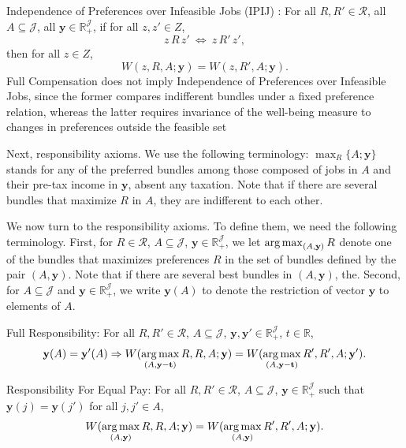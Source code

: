 Independence of Preferences over Infeasible Jobs (IPIJ) : 
For all $R,R'\in\mathcal R$, all $A\subseteq \mathcal J$, all $\mathbf y\in\mathbb R_+^{\mathcal J}$, if for all $z,z'\in Z$,
\[
z\,R\,z' \ \Longleftrightarrow\ z\,R'\,z',
\]
then for all $z\in Z $,
\begin{equation*}
\label{}
W(z,R,A;\mathbf y)=W(z,R',A;\mathbf y).
\end{equation*}
Full Compensation does not imply Independence of Preferences over Infeasible Jobs, since the former compares indifferent bundles under a fixed preference relation, whereas the latter requires invariance of the well-being measure to changes in preferences outside the feasible set

Next, responsibility axioms. We use the following terminology: $\max_{R}\{A;\mathbf{y}\}$ stands for any of the preferred bundles among those composed of jobs in $A$ and their pre-tax income in $\mathbf{y}$, absent any taxation. Note that if there are several bundles that maximize $R$ in $A$, they are indifferent to each other.

We now turn to the responsibility axioms. To define them, we need the following terminology. First, for $R\in \mathcal{R}$, $A\subseteq \mathcal{J}$, $\mathbf{y} \in \mathbb{R}_{+}^{\mathcal{J}}$, we let $\operatorname*{arg\,max}_{(A,\mathbf{y})}R$ denote one of the bundles that maximizes preferences $R$ in the set of bundles defined by the pair $(A,\mathbf{y})$. Note that if there are several best bundles in $(A,\mathbf{y})$, the. Second, for $A\subseteq \mathcal{J}$ and $\mathbf{y} \in \mathbb{R}_{+}^{\mathcal{J}}$, we write $\mathbf{y}(A)$ to denote the restriction of vector $\mathbf{y}$ to elements of $A$.



Full Responsibility: For all $R,R'\in \mathcal{R}$, $A\subseteq \mathcal{J}$, $\mathbf{y}, \mathbf{y'} \in \mathbb{R}_{+}^{\mathcal{J}}$, $t\in \mathbb{R}$, 
\begin{equation*}
\label{ }
\mathbf{y}(A) = \mathbf{y'}(A)\Rightarrow W(\operatorname*{arg\,max}_{(A,\mathbf{y-t})}R,R,A;\mathbf{y})=W(\operatorname*{arg\,max}_{(A,\mathbf{y -t })}R',R',A;\mathbf{y'}).
\end{equation*}


Responsibility For Equal Pay: For all $R,R'\in \mathcal{R}$, $A\subseteq \mathcal{J}$, $\mathbf{y} \in \mathbb{R}_{+}^{\mathcal{J}}$ such that $\mathbf{y}(j)=\mathbf{y}(j')$ for all $j,j'\in A$, 
\begin{equation*}
\label{ }
W(\operatorname*{arg\,max}_{(A,\mathbf{y})}R,R,A;\mathbf{y})=W(\operatorname*{arg\,max}_{(A,\mathbf{y})}R',R',A;\mathbf{y}).
\end{equation*}


